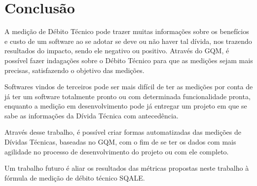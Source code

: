 \chapter[Conclusão]{Conclusão}
A medição de Débito Técnico pode trazer muitas informações sobre os benefícios e custo de um software ao 
se adotar se deve ou não haver tal dívida, nos trazendo resultados do impacto, sendo ele negativo ou positivo. Através do GQM, é possível fazer indagações sobre o Débito Técnico para que as medições sejam mais precisas, satisfazendo o objetivo das medições.


Softwares vindos de terceiros pode ser mais difícil de ter as medições por conta de já ter um software totalmente pronto ou com determinada funcionalidade pronta, enquanto a medição em desenvolvimento pode já entregar um projeto em que se sabe as informações da Dívida Técnica com antecedência.


Através desse trabalho, é possível criar formas automatizadas das medições de Dívidas Técnicas, baseadas no GQM, com o fim de se ter os dados com mais agilidade no processo de desenvolvimento do projeto ou com ele completo.

Um trabalho futuro é aliar os resultados das métricas propostas neste trabalho à fórmula de medição de débito técnico SQALE. 
